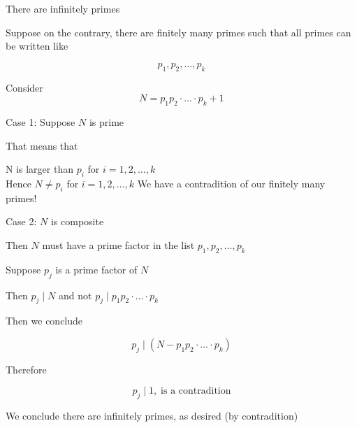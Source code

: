 \documentclass[../../Main.tex]{subfiles}
\begin{document}
\begin{proposition}
    There are infinitely primes

    \begin{poof}
        Suppose on the contrary, there are finitely many primes such that all primes can be written like

        $$p_1, p_2, \ldots, p_k$$

        Consider $$N = p_1 p_2 \cdot \ldots \cdot p_k + 1$$

        Case 1: Suppose $N$ is prime

        That means that
        \begin{center}
            N is larger than $p_i$ for $i = 1, 2, \ldots, k$ \\
            Hence $N \not = p_i$ for $i = 1, 2, \ldots, k$
            We have a contradition of our finitely many primes!
        \end{center}

        Case 2: $N$ is composite

        Then $N$ must have a prime factor in the list $p_1, p_2, \ldots, p_k$

        Suppose $p_j$ is a prime factor of $N$

        Then $p_j \mid N$ and not $p_j \mid p_1 p_2 \cdot \ldots \cdot p_k$

        Then we conclude

        $$p_j \mid (N - p_1 p_2 \cdot \ldots \cdot p_k)$$

        Therefore

        $$p_j \mid 1, \; \text{is a contradition}$$

        We conclude there are infinitely primes, as desired (by contradition)
    \end{poof}
\end{proposition}
\end{document}
